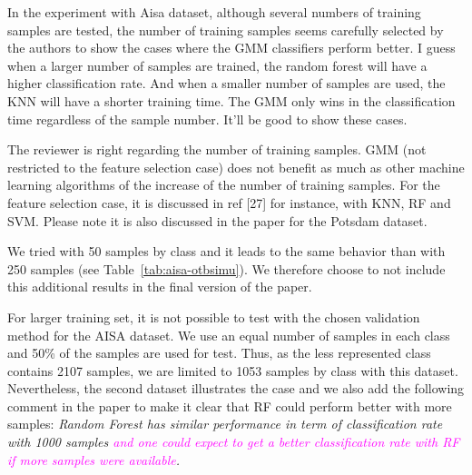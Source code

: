 \documentclass[a4paper,10pt,DIV=16]{scrartcl}
\newcommand{\rev}[1]{\textcolor{magenta}{#1}}
\begin{document}
\begin{revbox}
  In the experiment with Aisa dataset, although several numbers of training samples are tested, the number of training samples seems carefully selected by the authors to show the cases where the GMM classifiers perform better. I guess when a larger number of samples are trained, the random forest will have a higher classification rate. And when a smaller number of samples are used, the KNN will have a shorter training time. The GMM only wins in the classification time regardless of the sample number. It’ll be good to show these cases.
  \begin{resbox}
    The reviewer is right regarding the number of training samples. GMM (not restricted to the feature selection case) does not benefit as much as other machine learning algorithms of the increase of the number of training samples. For the feature selection case, it is discussed in ref [27] for instance, with KNN, RF and SVM. Please note it is also discussed in the paper for the Potsdam dataset.
    
    We tried with 50 samples by class and it leads to the same behavior than with 250 samples (see Table~\ref{tab:aisa-otbsimu}). We therefore choose to not include this additional results in the final version of the paper.

    For larger training set,  it is not possible to test with the chosen validation method for the AISA dataset. We use an equal number of samples in each class and 50\% of the samples are used for test. Thus, as the less represented class contains 2107 samples, we are limited to 1053 samples by class with this dataset. Nevertheless, the second dataset illustrates the case and we also add the following comment in the paper to make it clear that RF could perform better with more samples:
    \emph{Random Forest has similar performance in term of classification rate with 1000 samples \rev{ and one could expect to get a better classification rate with RF if more samples were available}.}
  \end{resbox}
\end{revbox}
\end{document}
